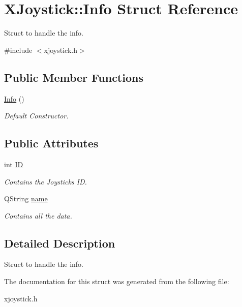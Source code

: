 \hypertarget{struct_x_joystick_1_1_info}{}\section{X\+Joystick\+:\+:Info Struct Reference}
\label{struct_x_joystick_1_1_info}


Struct to handle the info.  




{\ttfamily \#include $<$xjoystick.\+h$>$}

\subsection*{Public Member Functions}
\begin{DoxyCompactItemize}
\item 
\hypertarget{struct_x_joystick_1_1_info_a03da2d18c0c184642e38a2313935d696}{}\hyperlink{struct_x_joystick_1_1_info_a03da2d18c0c184642e38a2313935d696}{Info} ()\label{struct_x_joystick_1_1_info_a03da2d18c0c184642e38a2313935d696}

\begin{DoxyCompactList}\small\item\em Default Constructor. \end{DoxyCompactList}\end{DoxyCompactItemize}
\subsection*{Public Attributes}
\begin{DoxyCompactItemize}
\item 
\hypertarget{struct_x_joystick_1_1_info_ac94ec072c56923d48b69b402f5d8558a}{}int \hyperlink{struct_x_joystick_1_1_info_ac94ec072c56923d48b69b402f5d8558a}{I\+D}\label{struct_x_joystick_1_1_info_ac94ec072c56923d48b69b402f5d8558a}

\begin{DoxyCompactList}\small\item\em Contains the Joystick\textquotesingle{}s I\+D. \end{DoxyCompactList}\item 
\hypertarget{struct_x_joystick_1_1_info_afd89ff5f20e52a31601e643229a337c9}{}Q\+String \hyperlink{struct_x_joystick_1_1_info_afd89ff5f20e52a31601e643229a337c9}{name}\label{struct_x_joystick_1_1_info_afd89ff5f20e52a31601e643229a337c9}

\begin{DoxyCompactList}\small\item\em Contains all the data. \end{DoxyCompactList}\end{DoxyCompactItemize}


\subsection{Detailed Description}
Struct to handle the info. 

The documentation for this struct was generated from the following file\+:\begin{DoxyCompactItemize}
\item 
xjoystick.\+h\end{DoxyCompactItemize}
